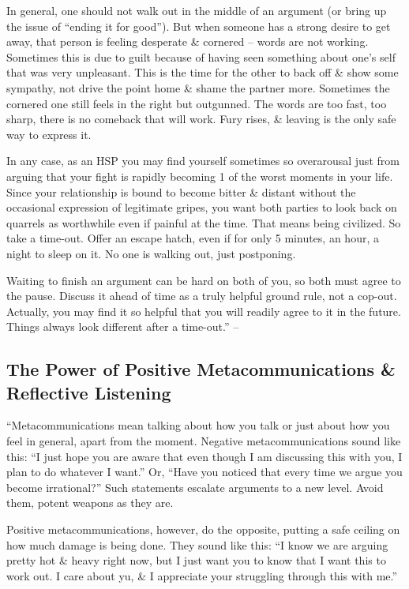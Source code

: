 \documentclass{article}
\numberwithin{equation}{section}
\begin{document}
In general, one should not walk out in the middle of an argument (or bring up the issue of ``ending it for good''). But when someone has a strong desire to get away, that person is feeling desperate \& cornered -- words are not working. Sometimes this is due to guilt because of having seen something about one's self that was very unpleasant. This is the time for the other to back off \& show some sympathy, not drive the point home \& shame the partner more. Sometimes the cornered one still feels in the right but outgunned. The words are too fast, too sharp, there is no comeback that will work. Fury rises, \& leaving is the only safe way to express it.

In any case, as an HSP you may find yourself sometimes so overarousal just from arguing that your fight is rapidly becoming 1 of the worst moments in your life. Since your relationship is bound to become bitter \& distant without the occasional expression of legitimate gripes, you want both parties to look back on quarrels as worthwhile even if painful at the time. That means being civilized. So take a time-out. Offer an escape hatch, even if for only 5 minutes, an hour, a night to sleep on it. No one is walking out, just postponing.

Waiting to finish an argument can be hard on both of you, so both must agree to the pause. Discuss it ahead of time as a truly helpful ground rule, not a cop-out. Actually, you may find it so helpful that you will readily agree to it in the future. Things always look different after a time-out.'' -- \cite[pp. 188--189]{Aron2013}

\subsection{The Power of Positive Metacommunications \& Reflective Listening}
``Metacommunications mean talking about how you talk or just about how you feel in general, apart from the moment. Negative metacommunications sound like this: ``I just hope you are aware that even though I am discussing this with you, I plan to do whatever I want.'' Or, ``Have you noticed that every time we argue you become irrational?'' Such statements escalate arguments to a new level. Avoid them, potent weapons as they are.

Positive metacommunications, however, do the opposite, putting a safe ceiling on how much damage is being done. They sound like this: ``I know we are arguing pretty hot \& heavy right now, but I just want you to know that I want this to work out. I care about yu, \& I appreciate your struggling through this with me.''
\end{document}
